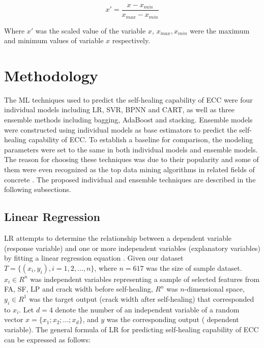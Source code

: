 \documentclass[11pt]{article}
\begin{document}
	\begin{equation}
	x' = \frac{x - x_{min}}{x_{max} - x_{min}}
	\end{equation}
	
	
	Where $x'$ was the scaled value of the variable $x$, $x_{max}, x_{min}$ were the maximum and minimum values of variable $x$ respectively.
	

	
	
	
	\section{Methodology}
	\label{meth}
	

	
	The ML techniques used to predict the self-healing capability of ECC were four individual models including LR, SVR, BPNN and CART, as well as three ensemble methods including bagging, AdaBoost and stacking. Ensemble models were constructed using individual models as base estimators to predict the self-healing capability of ECC. To establish a baseline for comparison, the modeling parameters were set to the same in both individual models and ensemble models. The reason for choosing these techniques was due to their popularity and some of them were even recognized as the top data mining algorithms in related fields of concrete \cite{chou2014machine}. The proposed individual and ensemble techniques are described in the following subsections.
	
	
	\subsection{Linear Regression}
	
	LR attempts to determine the relationship between a dependent variable (response variable) and one or more independent variables (explanatory variables) by fitting a linear regression equation \cite{neter1996applied}. Given our dataset $T = \{ (x_i,y_i), i = 1,2,...,n\}$, where $n = 617$ was the size of sample dataset. $x_i \in R^n$ was independent variables representing a sample of selected features from FA, SF, LP and crack width before self-healing, $R^n$ was $n$-dimensional space, $y_i \in R^1$ was the target output (crack width after self-healing) that corresponded to $x_i$. Let $d = 4$ denote the number of an independent variable  of a random vector $x = \{ x_1;x_2;...;x_d \}$, and $y$ was the corresponding output ( dependent variable). The general formula of LR for predicting self-healing capability of ECC can be expressed as follows:
	
\end{document}
